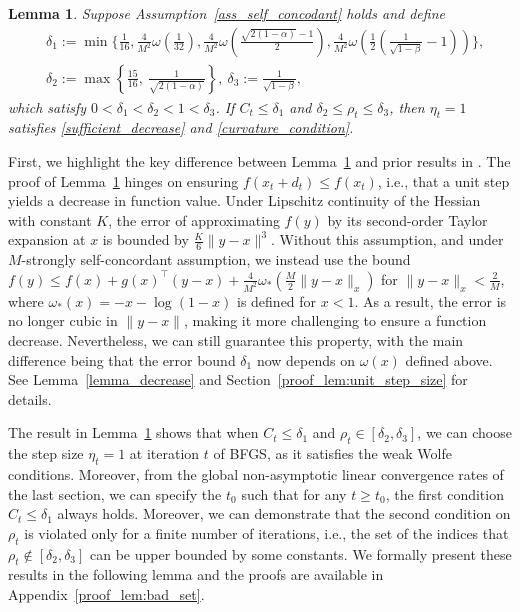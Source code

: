 \documentclass[11pt,letterpaper]{article}
\newcommand\0{{\Vector{0}}}
\newcommand\1{{\Vector{1}}}
\newtheorem{lemma}[theorem]{Lemma}
\numberwithin{assumption}{section}
\numberwithin{definition}{section}
\numberwithin{theorem}{section}
\numberwithin{remark}{section}
\begin{document}
\begin{lemma}\label{lem:unit_step_size}
    Suppose Assumption~\ref{ass_self_concodant} holds and define
    \begin{equation}\label{definition_delta_1_2_3}
    \begin{split}
        &\delta_1 := \min \bigg\{\frac{1}{16},  \frac{4}{M^2}\omega\left(\frac{1}{32}\right),  \frac{4}{M^2}\omega\left(\frac{\sqrt{2(1 - \alpha)} - 1}{2}\right)\!,  \frac{4}{M^2}\omega\left(\frac{1}{2}\left(\frac{1}{\sqrt{1 - \beta}} -\! 1\right)\right) \bigg\}, \\
        & \delta_2 := \max\left\{\frac{15}{16}, \ \frac{1}{\sqrt{2(1 - \alpha)}}\right\}, \ \delta_3 := \frac{1}{\sqrt{1 - \beta}},
    \end{split}
    \end{equation}
    which satisfy $0 < \delta_1 < \delta_2 < 1< \delta_3$.  If $C_t \leq \delta_1$ and $\delta_2 \leq \rho_t \leq \delta_3$, then $\eta_t = 1$ satisfies \eqref{sufficient_decrease} and \eqref{curvature_condition}.
\end{lemma}


First, we highlight the key difference between Lemma~\ref{lem:unit_step_size} and prior results in \cite{qiujiang2020quasinewton, qiujiang2024quasinewton, jin2024non}. The proof of Lemma~\ref{lem:unit_step_size} hinges on ensuring $f(x_t + d_t) \leq f(x_t)$, i.e., that a unit step yields a decrease in function value. Under Lipschitz continuity of the Hessian with constant $K$, the error of approximating $f(y)$ by its second-order Taylor expansion at $x$ is bounded by $\frac{K}{6}\|y - x\|^3$. Without this assumption, and under $M$-strongly self-concordant assumption, we instead use the bound
$f(y) \leq f(x) + g(x)^\top(y - x) + \frac{4}{M^2}\omega_{*}\left(\frac{M}{2}\|y - x\|_x\right)$
for $\|y - x\|_x < \frac{2}{M}$, where $\omega_{*}(x) = - x - \log(1 - x)$ is defined for $x < 1$. As a result, the error is no longer cubic in $\|y - x\|$, making it more challenging to ensure a function decrease. Nevertheless, we can still guarantee this property, with the main difference being that the error bound $\delta_1$ now depends on $\omega(x)$ defined above. See Lemma~\ref{lemma_decrease} and Section~\ref{proof_lem:unit_step_size} for details.


The result in Lemma~\ref{lem:unit_step_size} shows that when $C_t\leq\delta_1$ and $\rho_t \in [\delta_2, \delta_3]$, we can choose the step size $\eta_t = 1$ at iteration $t$ of BFGS, as it  satisfies the weak Wolfe conditions. 
Moreover, from the global non-asymptotic linear convergence rates of the last section, we can specify the $t_0$ such that for any $t \geq t_0$, the first condition $C_t \leq \delta_1$ always holds. Moreover, we can demonstrate that the second condition on $\rho_t$ is violated only for a finite number of iterations, i.e., the set of the indices that $\rho_t \notin [\delta_2, \delta_3]$ can be upper bounded by some constants. We formally present these results in the following lemma and the proofs are available in Appendix~\ref{proof_lem:bad_set}. 
\end{document}
